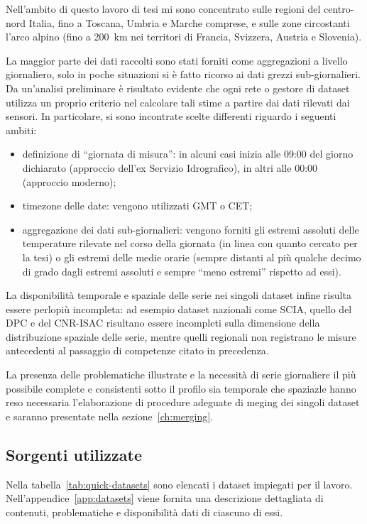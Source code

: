 Nell'ambito di questo lavoro di tesi mi sono concentrato sulle regioni del centro-nord Italia, fino a Toscana, Umbria e Marche comprese, e sulle zone circostanti l'arco alpino (fino a \qty{200}{\kilo\meter} nei territori di Francia, Svizzera, Austria e Slovenia).

La maggior parte dei dati raccolti sono stati forniti come aggregazioni a livello giornaliero, solo in poche situazioni si è fatto ricorso ai dati grezzi sub-giornalieri. Da un'analisi preliminare è risultato evidente che ogni rete o gestore di dataset utilizza un proprio criterio nel calcolare tali stime a partire dai dati rilevati dai sensori. In particolare, si sono incontrate scelte differenti riguardo i seguenti ambiti:

\begin{itemize}
  \item
    definizione di ``giornata di misura'': in alcuni casi inizia alle 09:00 del giorno dichiarato (approccio dell'ex Servizio Idrografico), in altri alle 00:00 (approccio moderno);
  \item
    timezone delle date: vengono utilizzati GMT o CET;
  \item
    aggregazione dei dati sub-giornalieri: vengono forniti gli estremi assoluti delle temperature rilevate nel corso della giornata (in linea con quanto cercato per la tesi) o gli estremi delle medie orarie (sempre distanti al più qualche decimo di grado dagli estremi assoluti e sempre ``meno estremi'' rispetto ad essi).
\end{itemize}

La disponibilità temporale e spaziale delle serie nei singoli dataset infine risulta essere perlopiù incompleta: ad esempio dataset nazionali come SCIA, quello del DPC e del CNR-ISAC risultano essere incompleti sulla dimensione della distribuzione spaziale delle serie, mentre quelli regionali non registrano le misure antecedenti al passaggio di competenze citato in precedenza.

La presenza delle problematiche illustrate e la necessità di serie giornaliere il più possibile complete e consistenti sotto il profilo sia temporale che spaziazle hanno reso necessaria l'elaborazione di procedure adeguate di meging dei singoli dataset e saranno presentate nella sezione~\ref{ch:merging}.

\subsection{Sorgenti utilizzate}\label{ch:sources}
Nella tabella~\ref{tab:quick-datasets} sono elencati i dataset impiegati per il lavoro. Nell'appendice~\ref{app:datasets} viene fornita una descrizione dettagliata di contenuti, problematiche e disponibilità dati di ciascuno di essi.

